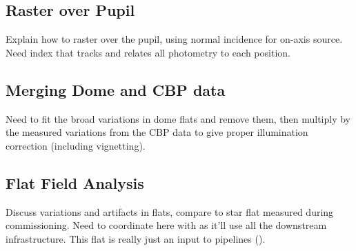\subsection{Raster over Pupil}

Explain how to raster over the pupil, using normal incidence for on-axis source. Need index that tracks and relates all photometry to each position.

\subsection{Merging Dome and CBP data}

Need to fit the broad variations in dome flats and remove them, then multiply by the measured variations from the CBP data to give proper illumination correction (including vignetting).

\subsection{Flat Field Analysis}

Discuss variations and artifacts in flats, compare to star flat measured during commissioning. Need to coordinate here with \cite{PSTN-026} as it'll use all the downstream infrastructure. This flat is really just an input to pipelines (\cite{PSTN-019}).
